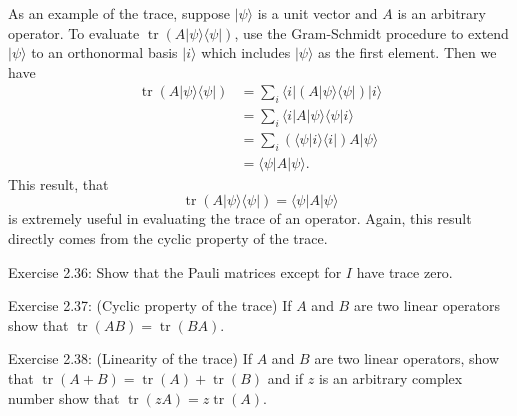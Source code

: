 As an example of the trace, suppose $|\psi\rangle$ is a unit vector and $A$ is an arbitrary operator. To evaluate $\operatorname{tr}(A|\psi\rangle\langle\psi|)$, use the Gram-Schmidt procedure to extend $|\psi\rangle$ to an orthonormal basis $|i\rangle$ which includes $|\psi\rangle$ as the first element. Then we have
\begin{equation}
\begin{aligned}
\operatorname{tr}(A|\psi\rangle\langle\psi|) 
& =\sum_{i}\langle i| \left(A| \psi\rangle\langle\psi | \right) | i\rangle \\
& =\sum_{i}\langle i| A| \psi\rangle\langle\psi |  i\rangle \\
& =\sum_{i}\left(\langle\psi |  i\rangle\langle i| \right) A| \psi\rangle \\
& =\langle\psi|A| \psi\rangle.
\end{aligned}
\end{equation}
This result, that 
\begin{equation}
    \operatorname{tr}(A|\psi\rangle\langle\psi|)=\langle\psi|A| \psi\rangle
\end{equation}
is extremely useful in evaluating the trace of an operator. Again, this result directly comes from the cyclic property of the trace.

\begin{exercise}
Exercise 2.36: Show that the Pauli matrices except for $I$ have trace zero.
\end{exercise}

\begin{exercise}
Exercise 2.37: (Cyclic property of the trace) If $A$ and $B$ are two linear operators show that $\operatorname{tr}(A B)=\operatorname{tr}(B A).$
\end{exercise}

\begin{exercise}
Exercise 2.38: (Linearity of the trace) If $A$ and $B$ are two linear operators, show that $\operatorname{tr}(A+B)=\operatorname{tr}(A)+\operatorname{tr}(B)$ and if $z$ is an arbitrary complex number show that $\operatorname{tr}(z A)=z \operatorname{tr}(A)$.
\end{exercise}

